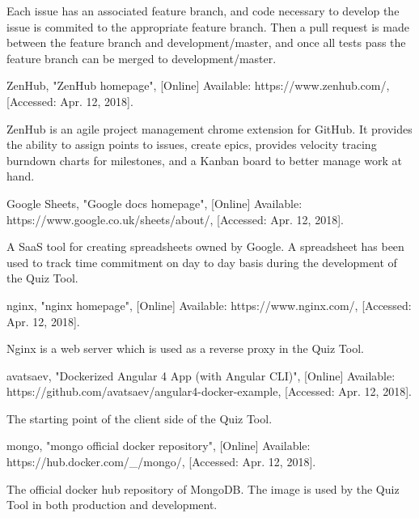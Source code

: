 \documentclass[11pt,a4paper]{report}
\begin{document}
\begin{thebibliography}{1}
    Each issue has an associated feature branch, and code necessary to develop the issue is commited to the appropriate feature branch.
    Then a pull request is made between the feature branch and development/master, and once all tests pass the feature branch can
    be merged to development/master.

 ZenHub, "ZenHub homepage", [Online] Available: https://www.zenhub.com/, [Accessed: Apr. 12, 2018].

    ZenHub is an agile project management chrome extension for GitHub. It provides the ability to assign points
    to issues, create epics, provides velocity tracing burndown charts for milestones, and a Kanban board to
    better manage work at hand.

 Google Sheets, "Google docs homepage", [Online] Available: https://www.google.co.uk/sheets/about/, [Accessed: Apr. 12, 2018].

  A SaaS tool for creating spreadsheets owned by Google. A spreadsheet has been used to track time commitment on day to day basis during
  the development of the Quiz Tool.

 nginx, "nginx homepage", [Online] Available: https://www.nginx.com/, [Accessed: Apr. 12, 2018].

  Nginx is a web server which is used as a reverse proxy in the Quiz Tool.

 avatsaev, "Dockerized Angular 4 App (with Angular CLI)", [Online] Available: https://github.com/avatsaev/angular4-docker-example, [Accessed: Apr. 12, 2018].

    The starting point of the client side of the Quiz Tool.

 mongo, "mongo official docker repository", [Online] Available: https://hub.docker.com/\_/mongo/, [Accessed: Apr. 12, 2018].

    The official docker hub repository of MongoDB. The image is used by the Quiz Tool in both production and development.

\end{thebibliography}
\end{document}
